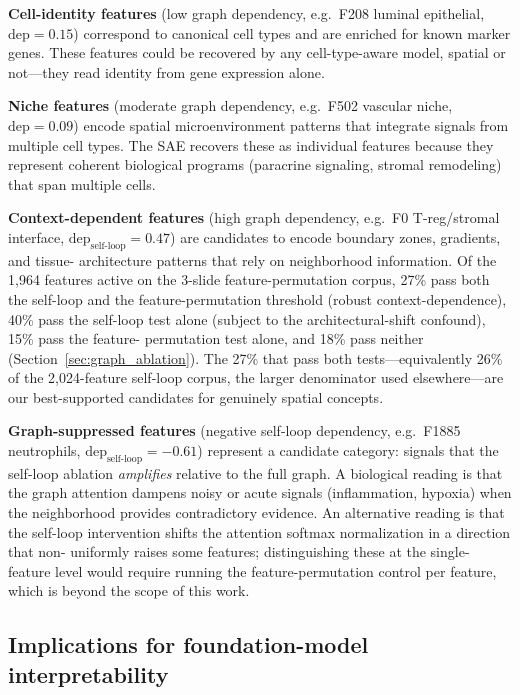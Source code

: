 \documentclass[11pt]{article}
\begin{document}
\textbf{Cell-identity features} (low graph dependency, e.g.\ F208
luminal epithelial, $\text{dep}=0.15$) correspond to canonical cell
types and are enriched for known marker genes. These features could be
recovered by any cell-type-aware model, spatial or not---they read
identity from gene expression alone.

\textbf{Niche features} (moderate graph dependency, e.g.\ F502
vascular niche, $\text{dep}=0.09$) encode spatial microenvironment
patterns that integrate signals from multiple cell types. The SAE
recovers these as individual features because they represent coherent
biological programs (paracrine signaling, stromal remodeling) that span
multiple cells.

\textbf{Context-dependent features} (high graph dependency, e.g.\ F0
T-reg/stromal interface, $\text{dep}_\text{self-loop}=0.47$) are
candidates to encode boundary zones, gradients, and tissue-
architecture patterns that rely on neighborhood information. Of the
1{,}964 features active on the 3-slide feature-permutation corpus,
27\% pass both the self-loop and the feature-permutation threshold
(robust context-dependence), 40\% pass the self-loop test alone
(subject to the architectural-shift confound), 15\% pass the feature-
permutation test alone, and 18\% pass neither
(Section~\ref{sec:graph_ablation}). The 27\% that pass both
tests---equivalently 26\% of the 2{,}024-feature self-loop corpus,
the larger denominator used elsewhere---are our best-supported
candidates for genuinely spatial concepts.

\textbf{Graph-suppressed features} (negative self-loop dependency,
e.g.\ F1885 neutrophils, $\text{dep}_\text{self-loop}=-0.61$)
represent a candidate category: signals that the self-loop ablation
\emph{amplifies} relative to the full graph. A biological reading is
that the graph attention dampens noisy or acute signals
(inflammation, hypoxia) when the neighborhood provides contradictory
evidence. An alternative reading is that the self-loop intervention
shifts the attention softmax normalization in a direction that non-
uniformly raises some features; distinguishing these at the single-
feature level would require running the feature-permutation control
per feature, which is beyond the scope of this work.

\subsection{Implications for foundation-model interpretability}
\end{document}
